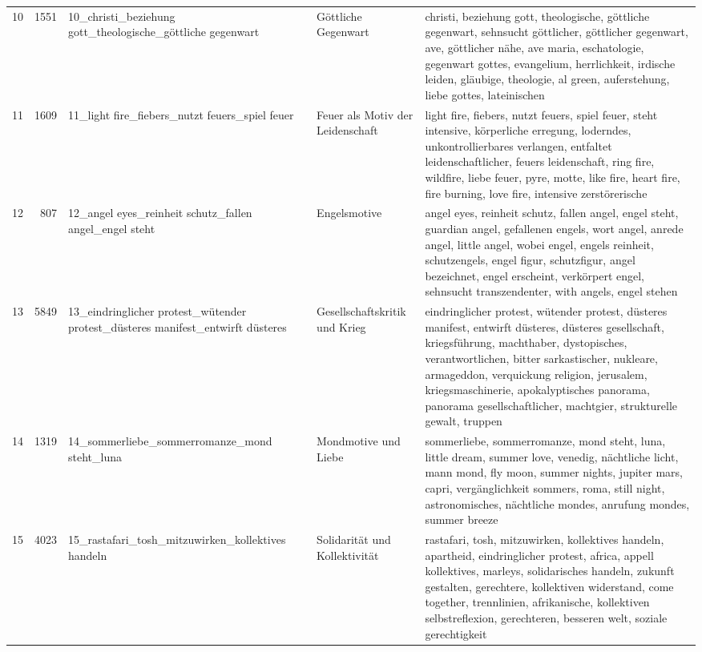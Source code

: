\begin{longtable}{rrlll}
10 & 1551 & 10\_christi\_beziehung gott\_theologische\_göttliche gegenwart & Göttliche Gegenwart & christi, beziehung gott, theologische, göttliche gegenwart, sehnsucht göttlicher, göttlicher gegenwart, ave, göttlicher nähe, ave maria, eschatologie, gegenwart gottes, evangelium, herrlichkeit, irdische leiden, gläubige, theologie, al green, auferstehung, liebe gottes, lateinischen \\
11 & 1609 & 11\_light fire\_fiebers\_nutzt feuers\_spiel feuer & Feuer als Motiv der Leidenschaft & light fire, fiebers, nutzt feuers, spiel feuer, steht intensive, körperliche erregung, loderndes, unkontrollierbares verlangen, entfaltet leidenschaftlicher, feuers leidenschaft, ring fire, wildfire, liebe feuer, pyre, motte, like fire, heart fire, fire burning, love fire, intensive zerstörerische \\
12 & 807 & 12\_angel eyes\_reinheit schutz\_fallen angel\_engel steht & Engelsmotive & angel eyes, reinheit schutz, fallen angel, engel steht, guardian angel, gefallenen engels, wort angel, anrede angel, little angel, wobei engel, engels reinheit, schutzengels, engel figur, schutzfigur, angel bezeichnet, engel erscheint, verkörpert engel, sehnsucht transzendenter, with angels, engel stehen \\
13 & 5849 & 13\_eindringlicher protest\_wütender protest\_düsteres manifest\_entwirft düsteres & Gesellschaftskritik und Krieg & eindringlicher protest, wütender protest, düsteres manifest, entwirft düsteres, düsteres gesellschaft, kriegsführung, machthaber, dystopisches, verantwortlichen, bitter sarkastischer, nukleare, armageddon, verquickung religion, jerusalem, kriegsmaschinerie, apokalyptisches panorama, panorama gesellschaftlicher, machtgier, strukturelle gewalt, truppen \\
14 & 1319 & 14\_sommerliebe\_sommerromanze\_mond steht\_luna & Mondmotive und Liebe & sommerliebe, sommerromanze, mond steht, luna, little dream, summer love, venedig, nächtliche licht, mann mond, fly moon, summer nights, jupiter mars, capri, vergänglichkeit sommers, roma, still night, astronomisches, nächtliche mondes, anrufung mondes, summer breeze \\
15 & 4023 & 15\_rastafari\_tosh\_mitzuwirken\_kollektives handeln & Solidarität und Kollektivität & rastafari, tosh, mitzuwirken, kollektives handeln, apartheid, eindringlicher protest, africa, appell kollektives, marleys, solidarisches handeln, zukunft gestalten, gerechtere, kollektiven widerstand, come together, trennlinien, afrikanische, kollektiven selbstreflexion, gerechteren, besseren welt, soziale gerechtigkeit \\

\end{longtable}

